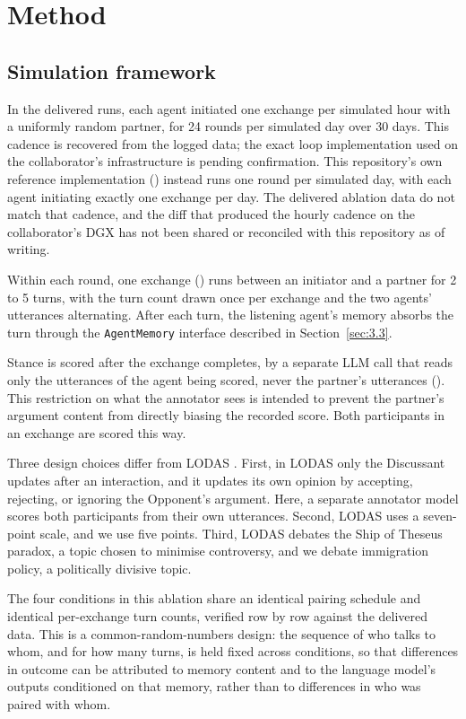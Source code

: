 \documentclass[11pt,a4paper]{article}
\begin{document}
\section{Method}\label{sec:3}

\subsection{Simulation framework}\label{sec:3.1}

In the delivered runs, each agent initiated one exchange per simulated hour with a uniformly random partner, for 24 rounds per simulated day over 30 days. This cadence is recovered from the logged data; the exact loop implementation used on the collaborator's infrastructure is pending confirmation. This repository's own reference implementation () instead runs one round per simulated day, with each agent initiating exactly one exchange per day. The delivered ablation data do not match that cadence, and the diff that produced the hourly cadence on the collaborator's DGX has not been shared or reconciled with this repository as of writing.

Within each round, one exchange () runs between an initiator and a partner for 2 to 5 turns, with the turn count drawn once per exchange and the two agents' utterances alternating. After each turn, the listening agent's memory absorbs the turn through the \texttt{AgentMemory} interface described in Section~\ref{sec:3.3}.

Stance is scored after the exchange completes, by a separate LLM call that reads only the utterances of the agent being scored, never the partner's utterances (). This restriction on what the annotator sees is intended to prevent the partner's argument content from directly biasing the recorded score. Both participants in an exchange are scored this way.

Three design choices differ from LODAS \citep{cau2025selective}. First, in LODAS only the Discussant updates after an interaction, and it updates its own opinion by accepting, rejecting, or ignoring the Opponent's argument. Here, a separate annotator model scores both participants from their own utterances. Second, LODAS uses a seven-point scale, and we use five points. Third, LODAS debates the Ship of Theseus paradox, a topic chosen to minimise controversy, and we debate immigration policy, a politically divisive topic.

The four conditions in this ablation share an identical pairing schedule and identical per-exchange turn counts, verified row by row against the delivered data. This is a common-random-numbers design: the sequence of who talks to whom, and for how many turns, is held fixed across conditions, so that differences in outcome can be attributed to memory content and to the language model's outputs conditioned on that memory, rather than to differences in who was paired with whom.
\end{document}
